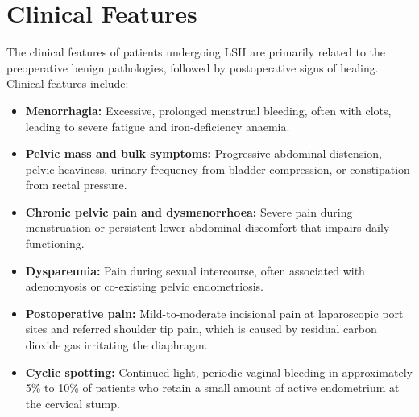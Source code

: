\section*{Clinical Features}
The clinical features of patients undergoing LSH are primarily related to the preoperative benign pathologies, followed by postoperative signs of healing. Clinical features include:
\begin{itemize}
    \item \textbf{Menorrhagia:} Excessive, prolonged menstrual bleeding, often with clots, leading to severe fatigue and iron-deficiency anaemia.
    \item \textbf{Pelvic mass and bulk symptoms:} Progressive abdominal distension, pelvic heaviness, urinary frequency from bladder compression, or constipation from rectal pressure.
    \item \textbf{Chronic pelvic pain and dysmenorrhoea:} Severe pain during menstruation or persistent lower abdominal discomfort that impairs daily functioning.
    \item \textbf{Dyspareunia:} Pain during sexual intercourse, often associated with adenomyosis or co-existing pelvic endometriosis.
    \item \textbf{Postoperative pain:} Mild-to-moderate incisional pain at laparoscopic port sites and referred shoulder tip pain, which is caused by residual carbon dioxide gas irritating the diaphragm.
    \item \textbf{Cyclic spotting:} Continued light, periodic vaginal bleeding in approximately 5\% to 10\% of patients who retain a small amount of active endometrium at the cervical stump.
\end{itemize}

